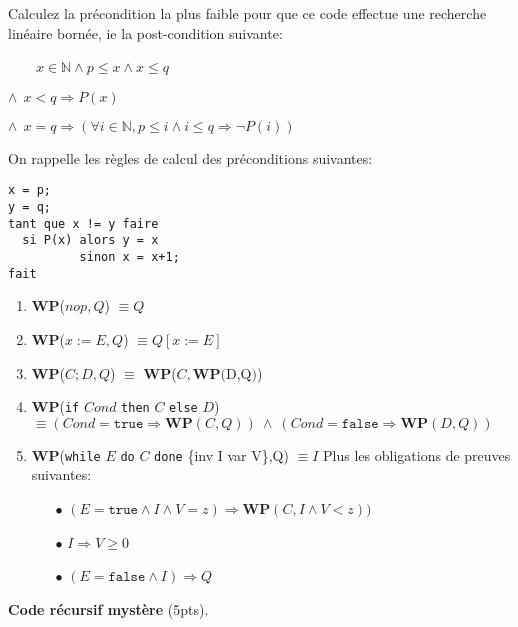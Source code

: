 \documentclass[10pt]{article}\usepackage[nu]{esial}
\begin{document}
\Question Calculez la précondition la plus faible pour que ce code effectue une
recherche linéaire bornée, ie la post-condition suivante:

\noindent\begin{minipage}{.6\linewidth}


~~~~$x\in\mathbb{N}\wedge p\leq x\wedge x\leq q$

$\wedge~~ x<q \Rightarrow P(x)$

$\wedge~~ x=q \Rightarrow (\forall i\in\mathbb{N}, p\leq i\wedge i\leq q
\Rightarrow \neg P(i)) $


\medskip On rappelle les règles de calcul des préconditions suivantes:
\end{minipage}\hfill
\begin{minipage}{.35\linewidth}
\begin{Verbatim}
x = p;
y = q;
tant que x != y faire
  si P(x) alors y = x
          sinon x = x+1;
fait  
\end{Verbatim}
\end{minipage}

\newcommand{\WP}[1]{\textbf{WP}($#1$)}
\begin{enumerate}
\item \WP{nop, Q}  $\equiv Q$
\item \WP{x:=E, Q} $\equiv Q[x:=E]$
\item \WP{C;D, Q}  $\equiv$ \WP{C, \WP{D,Q}}
\item \textbf{WP}(\texttt{if} $Cond$ \texttt{then} $C$ \texttt{else} $D$)
  $\equiv (Cond=\mathtt{true}\Rightarrow \mathbf{WP}(C,Q))~\wedge~
          (Cond=\mathtt{false}\Rightarrow \mathbf{WP}(D,Q))$
\item \textbf{WP}(\texttt{while} $E$ \texttt{do} $C$ \texttt{done} \{inv I var V\},Q)
  $\equiv I$\hfill
  Plus les obligations de preuves suivantes:
  \begin{itemize}
  \item[$\bullet$] $(E=\mathtt{true}\wedge I\wedge V=z) \Rightarrow
    \mathbf{WP}(C,I\wedge V<z))$
  \item[$\bullet$] $I\Rightarrow V\geq 0$
  \item[$\bullet$] $(E=\mathtt{false}\wedge I) \Rightarrow Q$
  \end{itemize}
\end{enumerate}


\Exercice\textbf{Code récursif mystère} (5pts).
\end{document}
